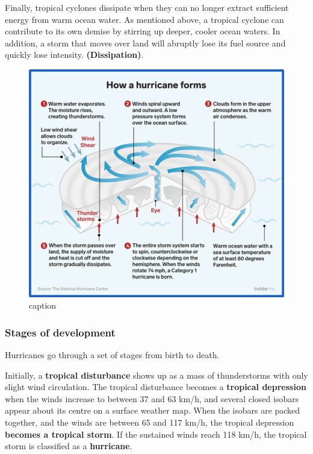 \documentclass[12pt,oneside]{book}
\begin{document}
Finally, tropical cyclones dissipate when they can no longer extract
sufficient energy from warm ocean water. As mentioned above, a tropical
cyclone can contribute to its own demise by stirring up deeper, cooler
ocean waters. In addition, a storm that moves over land will abruptly
lose its fuel source and quickly lose intensity. \textbf{(Dissipation)}.

\begin{figure}

{\centering \includegraphics[width=0.8\linewidth]{figures/FigureE13} 

}

\caption{caption}\label{fig:developingstorm}
\end{figure}

\subsubsection{Stages of development}\label{stages-of-development}

Hurricanes go through a set of stages from birth to death.

Initially, a \textbf{tropical disturbance} shows up as a mass of
thunderstorms with only slight wind circulation. The tropical
disturbance becomes a \textbf{tropical depression} when the winds
increase to between 37 and 63 km/h, and several closed isobars appear
about its centre on a surface weather map. When the isobars are packed
together, and the winds are between 65 and 117 km/h, the tropical
depression \textbf{becomes a tropical storm}. If the sustained winds
reach 118 km/h, the tropical storm is classified as a
\textbf{hurricane}.
\end{document}
